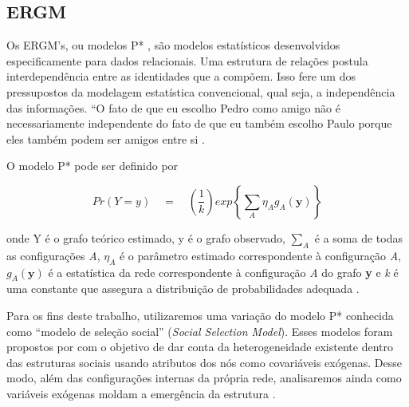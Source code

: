 \documentclass[a4paper, 12pt, openright, oneside, german, french, english, brazil]{abntex2}
\begin{document}
	\subsection{ERGM}
	
	Os ERGM's, ou modelos P* \cite{robins2007introduction,lusher2013exponential,lazega2014redes,brailly2017explorer}, são modelos estatísticos desenvolvidos especificamente para dados relacionais. Uma estrutura de relações postula interdependência entre as identidades que a compõem. Isso fere um dos pressupostos da modelagem estatística convencional, qual seja, a independência das informações. ``O fato de que eu escolho Pedro como amigo não é necessariamente independente do fato de que eu também escolho Paulo porque eles também podem ser amigos entre si \cite[p. 76]{lazega2014redes}.
	
	O modelo P* pode ser definido por
	
	\begin{equation}
	Pr(Y=y) \quad = \quad \left(\frac{1}{k}\right) exp \left\{ \sum_{A} \eta_A g_A (\textbf{y}) \right\}
	\end{equation}
	
	onde Y é o grafo teórico estimado, y é o grafo observado, $\sum_{A}$ é a soma de todas as configurações \textit{A},  $\eta_A$ é o parâmetro estimado correspondente à configuração \textit{A}, $g_A(\textbf{y})$ é a estatística da rede correspondente à configuração \textit{A} do grafo \textbf{y} e \textit{k} é uma constante que assegura a distribuição de probabilidades adequada \cite{robins2007introduction}.
	
	Para os fins deste trabalho, utilizaremos uma variação do modelo P* conhecida como ``modelo de seleção social'' (\textit{Social Selection Model}). Esses modelos foram propostos por  com o objetivo de dar conta da heterogeneidade existente dentro das estruturas sociais usando atributos dos nós como covariáveis exógenas. Desse modo, além das configurações internas da própria rede, analisaremos ainda como variáveis exógenas moldam a emergência da estrutura \cite{wang2016social}.
	
	
	
	
	
\end{document}
